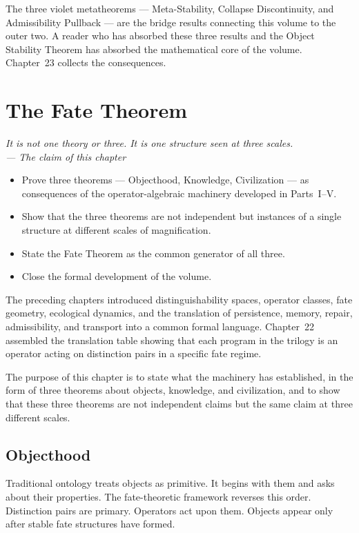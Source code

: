 \documentclass[12pt,twoside,openright]{book}
\newenvironment{epigraph}[2]{%
  \vspace{1em}\begin{flushright}
  \begin{minipage}{0.72\textwidth}
  \itshape\small #1\\[0.4em]
  \upshape\footnotesize\sffamily\color{DistGray}--- #2
  \end{minipage}\end{flushright}\vspace{1.5em}}{}
\newenvironment{objectives}{%
  \begin{tcolorbox}[colback=DistBlue!5,colframe=DistBlue,
    title={\faCheckCircle\enspace Chapter Objectives},
    fonttitle=\sffamily\bfseries\color{white},
    attach boxed title to top left={yshift=-2mm,xshift=4mm},
    boxed title style={colback=DistBlue},breakable]
  \begin{itemize}[leftmargin=*,nosep]}{%
  \end{itemize}\end{tcolorbox}\vspace{1em}}
\begin{document}
The three violet metatheorems --- Meta-Stability,
Collapse Discontinuity, and Admissibility Pullback --- are the
bridge results connecting this volume to the outer two. A
reader who has absorbed these three results and the Object
Stability Theorem has absorbed the mathematical core of the
volume. Chapter~23 collects the consequences.

\chapter{The Fate Theorem}
\label{ch:fate-theorem}

\begin{epigraph}{It is not one theory or three. It is one
  structure seen at three scales.}{The claim of this chapter}
\end{epigraph}

\begin{objectives}
\item Prove three theorems --- Objecthood, Knowledge,
  Civilization --- as consequences of the operator-algebraic
  machinery developed in Parts~I--V.
\item Show that the three theorems are not independent but
  instances of a single structure at different scales of
  magnification.
\item State the Fate Theorem as the common generator of all
  three.
\item Close the formal development of the volume.
\end{objectives}

The preceding chapters introduced distinguishability spaces,
operator classes, fate geometry, ecological dynamics, and the
translation of persistence, memory, repair, admissibility, and
transport into a common formal language. Chapter~22 assembled
the translation table showing that each program in the trilogy
is an operator acting on distinction pairs in a specific fate
regime.

The purpose of this chapter is to state what the machinery has
established, in the form of three theorems about objects,
knowledge, and civilization, and to show that these three
theorems are not independent claims but the same claim at three
different scales.

\section{Objecthood}

Traditional ontology treats objects as primitive. It begins
with them and asks about their properties. The fate-theoretic
framework reverses this order. Distinction pairs are primary.
Operators act upon them. Objects appear only after stable fate
structures have formed.
\end{document}
